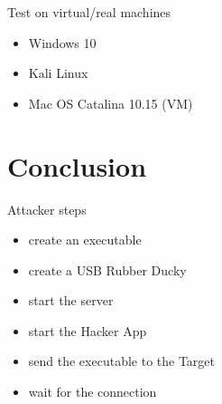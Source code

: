 \documentclass{beamer}
\begin{document}
\begin{frame}{Test on virtual/real machines}
\begin{itemize}
	\item Windows 10
	\item Kali Linux
	\item Mac OS Catalina 10.15 (VM)
\end{itemize}
\vspace{2em}
\end{frame}


\section{Conclusion}
\begin{frame}{Attacker steps}
\begin{itemize}
	\item create an executable
	\item create a USB Rubber Ducky
	\item start the server
	\item start the Hacker App
	\item send the executable to the Target
	\item wait for the connection
\end{itemize}
\end{frame}
\end{document}
